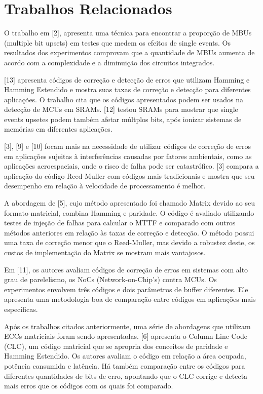 \chapter{Trabalhos Relacionados}
\label{CAP2}


O trabalho em [2], apresenta uma técnica para encontrar a proporção de MBUs (multiple bit upsets) em testes que medem os efeitos de single events. Os resultados dos experimentos comprovam que a quantidade de MBUs aumenta de acordo com a complexidade e a diminuição dos circuitos integrados.

[13] apresenta códigos de correção e detecção de erros que utilizam Hamming e Hamming Estendido e mostra suas taxas de correção e detecção para diferentes aplicações. O trabalho cita que os códigos apresentados podem ser usados na detecção de MCUs em SRAMs. [12] testou SRAMs para mostrar que single events upsetes podem também afetar múltplos bits, após ionizar sistemas de memórias em diferentes aplicações.

[3], [9] e [10] focam mais na necessidade de utilizar códigos de correção de erros em aplicações sujeitas à interferências causadas por fatores ambientais, como as aplicações aeroespaciais, onde o risco de falha pode ser catastrófico. [3] compara a aplicação do código Reed-Muller com códigos mais tradicionais e mostra que seu desempenho em relação à velocidade de processamento é melhor.

A abordagem de [5], cujo método apresentado foi chamado Matrix devido ao seu formato matricial, combina Hamming e paridade. O código é avaliado utilizando testes de injeção de falhas para calcular o MTTF e comparado com outros métodos anteriores em relação às taxas de correção e detecção. O método possui uma taxa de correção menor que o Reed-Muller, mas devido a robustez deste, os custos de implementação do Matrix se mostram mais vantajosos.

Em [11], os autores avaliam códigos de correção de erros em sistemas com alto grau de parelelismo, os NoCs (Network-on-Chip’s) contra MCUs. Os experimentos envolvem três códigos e dois parâmetros de buffer diferentes. Ele apresenta uma metodologia boa de comparação entre códigos em aplicações mais específicas.

Após os trabalhos citados anteriormente, uma série de abordagens que utilizam ECCs matriciais foram sendo apresentadas. [6] apresenta o Column Line Code (CLC), um código matricial que se apropria dos conceitos de paridade e Hamming Estendido. Os autores avaliam o código em relação a área ocupada, potência consumida e latência. Há também comparação entre os códigos para diferentes quantidades de bits de erro, apontando que o CLC corrige e detecta mais erros que os códigos com os quais foi comparado.

